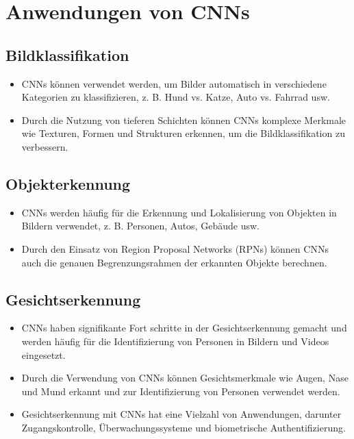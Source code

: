 \section{Anwendungen von CNNs}

\subsection{Bildklassifikation}
\begin{itemize}
  \item CNNs können verwendet werden, um Bilder automatisch in verschiedene Kategorien zu klassifizieren, z. B. Hund vs. Katze, Auto vs. Fahrrad usw.
  \item Durch die Nutzung von tieferen Schichten können CNNs komplexe Merkmale wie Texturen, Formen und Strukturen erkennen, um die Bildklassifikation zu verbessern.
\end{itemize}

\subsection{Objekterkennung}
\begin{itemize}
  \item CNNs werden häufig für die Erkennung und Lokalisierung von Objekten in Bildern verwendet, z. B. Personen, Autos, Gebäude usw.
  \item Durch den Einsatz von Region Proposal Networks (RPNs) können CNNs auch die genauen Begrenzungsrahmen der erkannten Objekte berechnen.
\end{itemize}

\subsection{Gesichtserkennung}
\begin{itemize}
  \item CNNs haben signifikante Fort
  schritte in der Gesichtserkennung gemacht und werden häufig für die Identifizierung von Personen in Bildern und Videos eingesetzt.
  \item Durch die Verwendung von CNNs können Gesichtsmerkmale wie Augen, Nase und Mund erkannt und zur Identifizierung von Personen verwendet werden.
  \item Gesichtserkennung mit CNNs hat eine Vielzahl von Anwendungen, darunter Zugangskontrolle, Überwachungssysteme und biometrische Authentifizierung.
\end{itemize}

